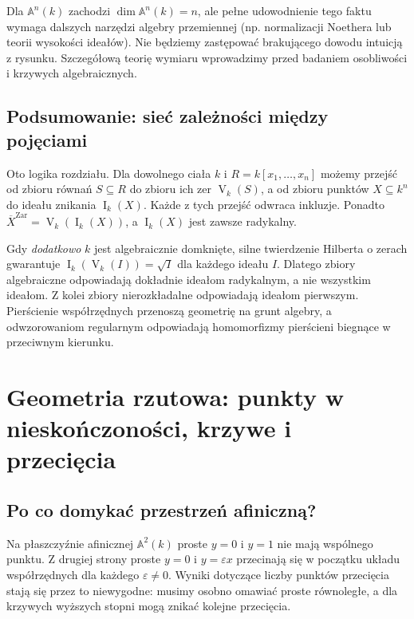 \documentclass[11pt,a4paper,openany]{report}
\numberwithin{equation}{section}
\theoremstyle{plain}
\theoremstyle{definition}
\theoremstyle{remark}
\newcommand{\A}{\mathbb A}
\newcommand{\V}{\operatorname V}
\newcommand{\I}{\operatorname I}
\begin{document}
Dla $\A^n(k)$ zachodzi $\dim\A^n(k)=n$, ale pełne
udowodnienie tego faktu wymaga dalszych narzędzi algebry przemiennej
(np. normalizacji Noethera lub teorii wysokości ideałów).
Nie będziemy zastępować brakującego dowodu intuicją z rysunku.
Szczegółową teorię wymiaru wprowadzimy przed badaniem
osobliwości i krzywych algebraicznych.

\section{Podsumowanie: sieć zależności między pojęciami}

Oto logika rozdziału. Dla dowolnego ciała $k$ i
$R=k[x_1,\dots,x_n]$ możemy przejść od zbioru równań
$S\subseteq R$ do zbioru ich zer $\V_k(S)$, a od zbioru
punktów $X\subseteq k^n$ do ideału znikania $\I_k(X)$.
Każde z tych przejść odwraca inkluzje. Ponadto
$\overline X^{\mathrm{Zar}}=\V_k(\I_k(X))$,
a $\I_k(X)$ jest zawsze radykalny.

Gdy \emph{dodatkowo} $k$ jest algebraicznie domknięte,
silne twierdzenie Hilberta o zerach gwarantuje
$\I_k(\V_k(I))=\sqrt I$ dla każdego ideału $I$.
Dlatego zbiory algebraiczne odpowiadają dokładnie
ideałom radykalnym, a nie wszystkim ideałom.
Z kolei zbiory nierozkładalne odpowiadają ideałom pierwszym.
Pierścienie współrzędnych przenoszą geometrię na grunt algebry,
a odwzorowaniom regularnym odpowiadają homomorfizmy
pierścieni biegnące w przeciwnym kierunku.

\chapter{Geometria rzutowa: punkty w nieskończoności, krzywe i przecięcia}
\label{ch:rzutowa}

\providecommand{\atlasref}[2]{#2}


\section{Po co domykać przestrzeń afiniczną?}

Na płaszczyźnie afinicznej $\A^2(k)$ proste $y=0$ i $y=1$ nie
mają wspólnego punktu. Z drugiej strony proste $y=0$ i $y=\varepsilon x$
przecinają się w początku układu współrzędnych dla każdego
$\varepsilon\ne0$. Wyniki dotyczące liczby punktów przecięcia
stają się przez to niewygodne: musimy osobno omawiać proste równoległe,
a dla krzywych wyższych stopni mogą znikać kolejne przecięcia.
\end{document}
